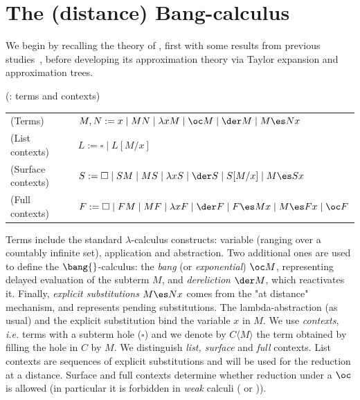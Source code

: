 \setcounter{section}{1}\section{The (distance) Bang-calculus}\label{sec:dbang}
We begin by recalling the theory of \dbang{}, first
with some results from previous
studies~\cite{kag24,agk24d,bucciarelli2023bang}, before developing its approximation theory via Taylor expansion and approximation trees.


\begin{definition}{(\dbang: terms and contexts)}~
	\label{def:dbang-terms-and-ctxs}

	\begin{tabular}{ll}
		(Terms) & $M,N: = x\mid MN\mid \lambda xM \mid \oc M \mid \der M \mid M\es Nx$ \\
		
		(List contexts) & $L:= \square \mid L[M/x]$ \\

		(Surface contexts) & $S:= \square \mid SM \mid MS \mid \lambda x S \mid
		\der S \mid S[M/x] \mid	M\es Sx$\\

		(Full contexts) &  $F:= \square \mid FM \mid MF \mid \lambda x F \mid \der F \mid F\es Mx \mid
		M\es Fx \mid \oc F$ \\

	\end{tabular}
\end{definition}
Terms include the standard $\lambda$-calculus constructs: variable (ranging over a countably infinite set), application and abstraction. Two additional ones are used to define the $\bang{}$-calculus: the \emph{bang} (or \emph{exponential}) $\oc M$,
representing delayed evaluation of the subterm
$M$, and \emph{dereliction} $\der M$, which reactivates it.
Finally, \emph{explicit substitutions} $M \es N x$ comes from the "at distance" mechanism, and represents 
pending substitutions.
The lambda-abstraction (as usual) and the explicit substitution
bind the variable $x$ in $M$. We use \emph{contexts}, \emph{i.e.} terms with a subterm hole
($\square$) and  we denote by $C\langle M \rangle$ the term
obtained by filling the hole in $C$ by $M$. We distinguish \emph{list, surface} and \emph{full} contexts. List
contexts are sequences of explicit substitutions and will be used for the reduction
at a distance. Surface and full contexts determine whether reduction under a
$\oc$ is allowed (in particular it is forbidden in \emph{weak}
calculi (\cbn{} or \cbv{})).

